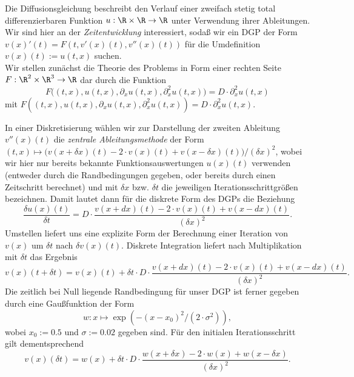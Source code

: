 \documentclass[
    oneside,
    ngerman,
    footinclude=false,
    captions=tableheading,
    DIV=12
]{scrartcl}
\begin{document}
    \aufgabe{}
        \subaufgabe{}
			Die Diffusionsgleichung beschreibt den Verlauf einer zweifach stetig total differenzierbaren Funktion $u:\R\times\R\to\R$ unter Verwendung ihrer Ableitungen. Wir sind hier an der \emph{Zeitentwicklung} interessiert, sodaß wir ein DGP der Form $v(x)'(t)=F(t,v'(x)(t),v''(x)(t))$ für die Umdefinition $v(x)(t):=u(t,x)$ suchen. \\

			Wir stellen zunächst die Theorie des Problems in Form einer rechten Seite $F:\R^2\times\R^3\to\R$ dar durch die Funktion
            \[
                F\bigl((t,x),u(t,x),\partial_x u(t,x),\partial_x^2 u(t,x)\bigr) = D\cdot \partial_x^2 u(t,x)
            \]
			mit $F((t,x),u(t,x),\partial_x u(t,x),\partial_x^2u(t,x)) = D\cdot\partial_x^2u(t,x)$. 

			In einer Diskretisierung wählen wir zur Darstellung der zweiten Ableitung $v''(x)(t)$ die \emph{zentrale Ableitungsmethode} der Form $(t,x)\mapsto \bigl(v(x + \delta x)(t) - 2\cdot v(x)(t) + v(x - \delta x)(t)\bigr)/(\delta x)^2$, wobei wir hier nur bereits bekannte Funktionsauswertungen $u(x)(t)$ verwenden (entweder durch die Randbedingungen gegeben, oder bereits durch einen Zeitschritt berechnet) und mit $\delta x$ bzw. $\delta t$ die jeweiligen Iterationsschrittgrößen bezeichnen. Damit lautet dann für die diskrete Form des DGPs die Beziehung
			\[
				\frac{\delta u(x)(t)}{\delta t} = D\cdot\frac{v(x + dx)(t) - 2\cdot v(x)(t) + v(x - dx)(t)}{(\delta x)^2}.
			\]
			Umstellen liefert uns eine explizite Form der Berechnung einer Iteration von $v(x)$ um $\delta t$ nach $\delta v(x)(t)$. Diskrete Integration liefert nach Multiplikation mit $\delta t$ das Ergebnis
			\[
				v(x)(t + \delta t) = v(x)(t) + \delta t\cdot D\cdot\frac{v(x + dx)(t) - 2\cdot v(x)(t) + v(x - dx)(t)}{(\delta x)^2}.
			\]
			Die zeitlich bei Null liegende Randbedingung für unser DGP ist ferner gegeben durch eine Gaußfunktion der Form 
			\[
				w:x\mapsto\exp(-(x - x_0)^2/(2\cdot\sigma^2)),
			\]
			wobei $x_0 := 0.5$ und $\sigma:=0.02$ gegeben sind. Für den initialen Iterationsschritt gilt dementsprechend
			\[
				v(x)(\delta t) = w(x) + \delta t\cdot D\cdot\frac{w(x + \delta x) - 2\cdot w(x) + w(x - \delta x)}{(\delta x)^2}.
			\]
						
\end{document}
